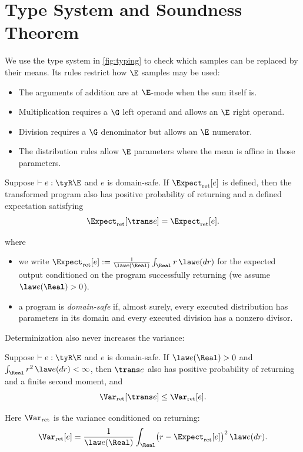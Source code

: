 \section{Type System and Soundness Theorem}
\label{sec:type-system}



We use the type system in \cref{fig:typing} to check which samples can be replaced
by their means. Its rules restrict how $\E$ samples may be used:
\begin{itemize}
    \item The arguments of addition are at $\E$-mode when the sum itself is.
    \item Multiplication requires a $\G$ left operand and allows an $\E$ right operand. 
    \item Division requires a $\G$ denominator but allows an $\E$ numerator.
    \item The distribution rules allow $\E$ parameters where the mean is
affine in those parameters. 
\end{itemize}

\begin{theorem}
\label{thm:expectation}
Suppose $\vdash e:\tyR\E$ and $e$ is domain-safe. If
$\Expect_{\mathrm{ret}}[e]$ is defined, then the transformed program also has
positive probability of returning and a defined expectation satisfying
\[
 \Expect_{\mathrm{ret}}[\trans e]=\Expect_{\mathrm{ret}}[e].
\]
\end{theorem}
where
\begin{itemize}
    \item we write
$
 \Expect_{\mathrm{ret}}[e]\mathrel{:=}
 \frac{1}{\law e(\Real)}\int_{\Real} r\,\law e(dr)
$
for the expected output conditioned on the program successfully returning
(we assume $\law e(\Real)>0$).
    \item a program is \emph{domain-safe} if,
almost surely, every executed distribution has parameters in its domain and
every executed division has a nonzero divisor.
\end{itemize}

Determinization also never increases the variance:

\begin{theorem}
\label{thm:variance}
Suppose $\vdash e:\tyR\E$ and $e$ is domain-safe. If
$\law e(\Real)>0$ and $\int_{\Real}r^2\,\law e(dr)<\infty$, then $\trans e$
also has positive probability of returning and a finite second moment, and
\[
 \Var_{\mathrm{ret}}[\trans e]\le\Var_{\mathrm{ret}}[e].
\]
\end{theorem}
Here $\Var_{\mathrm{ret}}$ is the variance conditioned on returning:
\[
  \Var_{\mathrm{ret}}[e]=\frac1{\law e(\Real)}\int_{\Real}
    \bigl(r-\Expect_{\mathrm{ret}}[e]\bigr)^2\,\law e(dr).
\]

